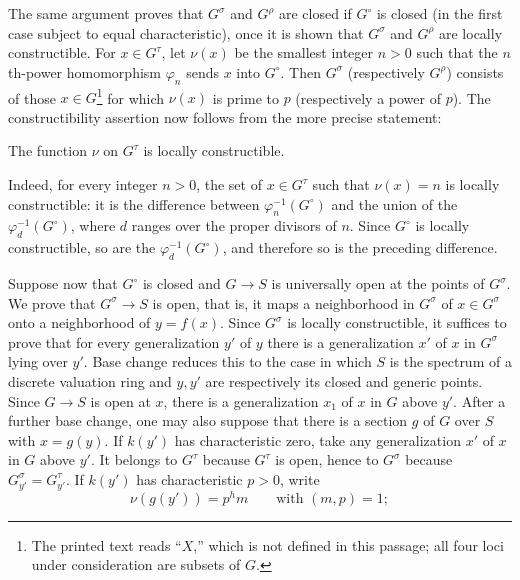 The same argument proves that $G^\sigma$ and $G^\rho$ are closed if $G^\circ$
is closed (in the first case subject to equal characteristic), once it is shown
that $G^\sigma$ and $G^\rho$ are locally constructible. For $x\in G^\tau$, let
$\nu(x)$ be the smallest integer $n>0$ such that the $n$th-power homomorphism
$\varphi_n$ sends $x$ into $G^\circ$. Then $G^\sigma$ (respectively $G^\rho$)
consists of those $x\in G$\footnote{The printed text reads “$X$,” which is not
defined in this passage; all four loci under consideration are subsets of
$G$.} for which $\nu(x)$ is prime to $p$ (respectively a power of $p$). The
constructibility assertion now follows from the more precise statement:

 The function $\nu$ on $G^\tau$ is locally constructible.

Indeed, for every integer $n>0$, the set of $x\in G^\tau$ such that
$\nu(x)=n$ is locally constructible: it is the difference between
$\varphi_n^{-1}(G^\circ)$ and the union of the
$\varphi_d^{-1}(G^\circ)$, where $d$ ranges over the proper divisors of $n$.
Since $G^\circ$ is locally constructible, so are the
$\varphi_d^{-1}(G^\circ)$, and therefore so is the preceding difference.

Suppose now that $G^\circ$ is closed and $G\longrightarrow S$ is universally
open at the points of $G^\sigma$. We prove that
$G^\sigma\longrightarrow S$ is open, that is, it maps a neighborhood in
$G^\sigma$ of $x\in G^\sigma$ onto a neighborhood of $y=f(x)$. Since
$G^\sigma$ is locally constructible, it suffices to prove that for every
generalization $y'$ of $y$ there is a generalization $x'$ of $x$ in
$G^\sigma$ lying over $y'$. Base change reduces this to the case in which $S$
is the spectrum of a discrete valuation ring and $y,y'$ are respectively its
closed and generic points. Since $G\longrightarrow S$ is open at $x$, there is
a generalization $x_1$ of $x$ in $G$ above $y'$. After a further base change,
one may also suppose that there is a section $g$ of $G$ over $S$ with
$x=g(y)$. If $k(y')$ has characteristic zero, take any generalization $x'$ of
$x$ in $G$ above $y'$. It belongs to $G^\tau$ because $G^\tau$ is open, hence
to $G^\sigma$ because $G_{y'}^\sigma=G_{y'}^\tau$. If $k(y')$ has
characteristic $p>0$, write
\[
\nu(g(y'))=p^hm\qquad\text{with }(m,p)=1;
\]

